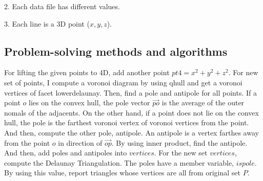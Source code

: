 \documentclass[11pt]{article}
\begin{document}
2. Each data file has different values.

3. Each line is a 3D point ($x, y, z$).

\subsection{Problem-solving methods and algorithms}
For lifting the given points to 4D, add another point $pt4 = x^2+y^2+z^2$. For new set of points, I compute a voronoi diagram by using qhull\cite{qhull-library} and get a voronoi vertices of facet lowerdelaunay. Then, find a pole and antipole for all points. If a point $o$ lies on the convex hull, the pole vector $\vec{po}$ is the average of the outer nomals of the adjacents. On the other hand, if a point does not lie on the convex hull, the pole is the farthest voronoi vertex of voronoi vertices from the point. And then, compute the other pole, antipole. An antipole is a vertex farthes away from the point $o$ in direction of $\vec{op}$. By using inner product, find the antipole. And then, add poles and antipoles into $vertices$. For the new set $vertices$, compute the Delaunay Triangulation. The poles have a member variable, $ispole$. By using this value, report triangles whose vertices are all from original set $P$.
\end{document}
